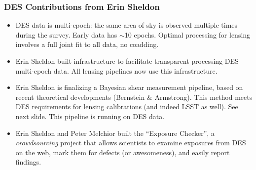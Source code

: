 \documentclass{beamer}
\begin{document}
\frame
{
    \frametitle{DES Contributions from Erin Sheldon}

    \fontsize{9}{0.9\baselineskip}
    \begin{itemize}

        \item DES data is multi-epoch: the same area of sky is observed
            multiple times during the survey.  Early data has $\sim$10 epochs.
            Optimal processing for lensing involves a full joint fit to all
            data, no coadding.

        \item Erin Sheldon built infrastructure to facilitate transparent
            processing DES multi-epoch data.  All lensing pipelines now use
            this infrastructure.

        \item Erin Sheldon is finalizing a Bayesian shear measurement pipeline,
            based on recent theoretical developments (Bernstein \& Armstrong).
            This method meets DES requirements for lensing calibrations (and indeed
            LSST as well).  See next slide.  This pipeline is running on DES data.

        \item Erin Sheldon and Peter Melchior built the ``Exposure Checker'', a
            {\it crowdsourcing} project that allows scientists to examine exposures
            from DES on the web, mark them for defects (or awesomeness),
            and easily report findings.

    \end{itemize}
}
\end{document}
